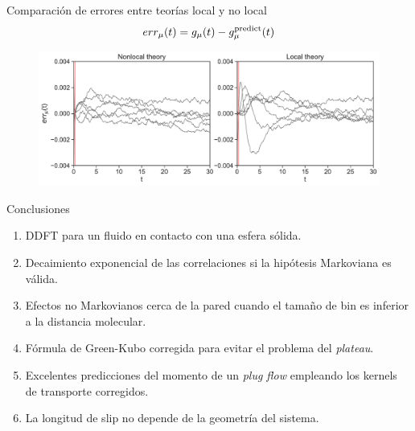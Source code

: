 \documentclass{beamer}
\begin{document}
\begin{frame}{Comparación de errores entre teorías local y no local}
  \begin{align}
  err_\mu(t)=  g_\mu(t)-g^{\rm predict}_\mu(t)
    \nonumber
  \end{align}
    \begin{figure}
\includegraphics[width=\linewidth]{errors-17nodes-WALLS-defense}
\end{figure}
\end{frame}

\begin{frame}{Conclusiones}
  \begin{enumerate}
    \item<1-> DDFT para un fluido en contacto con una esfera sólida. 
    \item<2-> Decaimiento exponencial de las correlaciones si la hipótesis Markoviana es válida. 
    \item<3-> Efectos no Markovianos cerca de la pared cuando el tamaño de bin es inferior a la distancia molecular. 
    \item<4-> Fórmula de Green-Kubo corregida para evitar el problema del \textit{plateau}.
    \item<5-> Excelentes predicciones del momento de un \textit{plug flow} empleando los kernels de transporte corregidos. 
    \item<6-> La longitud de slip no depende de la geometría del sistema.  
  \end{enumerate}
\end{frame}
\end{document}
